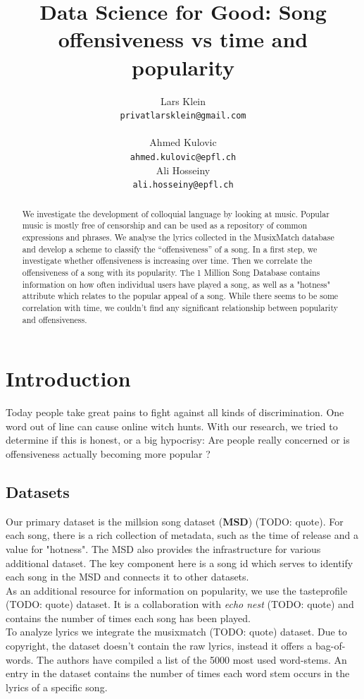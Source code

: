 \documentclass[11pt]{article}
\title{Data Science for Good: Song offensiveness vs time and popularity}
\author{Lars Klein \\
  {\tt privatlarsklein@gmail.com} \\\And
  \\Ahmed Kulovic \\
  {\tt ahmed.kulovic@epfl.ch} \\\And
Ali Hosseiny \\
{\tt ali.hosseiny@epfl.ch} \\}
\date{}
\begin{document}
\maketitle
\begin{abstract}
We investigate the development of colloquial language by looking at music. 
Popular music is mostly free of censorship and can be used as a repository of common expressions and phrases. 
We analyse the lyrics collected in the MusixMatch database and develop a scheme to classify the “offensiveness” of a song. 
In a first step, we investigate whether offensiveness is increasing over time. Then we correlate the offensiveness of a song with its popularity. 
The 1 Million Song Database contains information on how often individual users have played a song, as well as a "hotness" attribute which relates to the popular appeal of a song.
While there seems to be some correlation with time, we couldn't find any significant relationship between popularity and offensiveness.
\end{abstract}



\section{Introduction}

Today people take great pains to fight against all kinds of discrimination. 
One word out of line can cause online witch hunts. 
With our research, we tried to determine if this is honest, or a big hypocrisy: 
Are people really concerned or is offensiveness actually becoming more popular ?

\subsection{Datasets}

Our primary dataset is the millsion song dataset (\textbf{MSD}) (TODO: quote).
For each song, there is a rich collection of metadata, such as the time of release and a value for "hotness".
The MSD also provides the infrastructure for various additional dataset. The key component here is a song id
which serves to identify each song in the MSD and connects it to other datasets.\\
As an additional resource for information on popularity, we use the tasteprofile (TODO: quote) dataset.
It is a collaboration with \textit{echo nest} (TODO: quote) and contains the number of times each song has been played.\\
To analyze lyrics we integrate the musixmatch (TODO: quote) dataset. Due to copyright, the dataset doesn't contain the raw lyrics,
instead it offers a bag-of-words. The authors have compiled a list of the 5000 most used word-stems. An entry in the dataset contains
the number of times each word stem occurs in the lyrics of a specific song.
\end{document}
